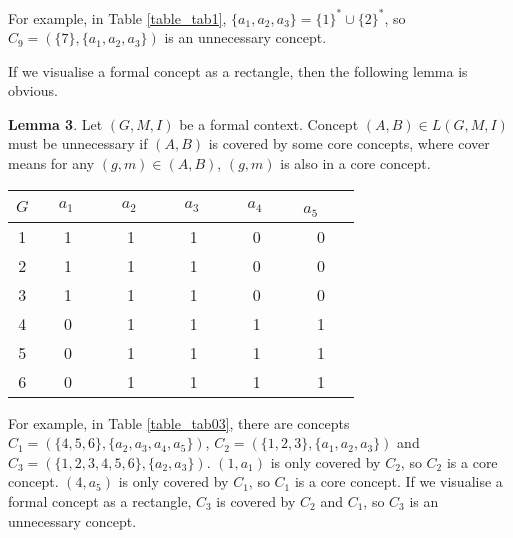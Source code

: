 \documentclass[11pt]{article}
\numberwithin{equation}{subsection}
\begin{document}
For example, in Table \ref{table_tab1}, $\{a_1, a_2, a_3\}=\{1\}^* \cup \{2\}^*$, so $C_9=(\{7\},\{a_1, a_2, a_3\}) $ is an  unnecessary concept.

If we visualise a formal concept as a rectangle, then the following lemma is obvious.

\textbf{ Lemma 3}. Let $(G, M, I)$ be a formal context.  Concept $(A,B)\in L(G, M, I)$ must be unnecessary if $(A,B)$ is covered by some core concepts, where cover means for any $(g,m)\in (A,B)$, $(g,m)$ is also in a core concept.





 \begin{table*}[ht]
            \begin{center}
                \begin{normalsize}
                    \caption{Formal context $(G, M, I_3)$}
                    \label{table_tab03}
                    \begin{tabular}
                        {|c|c c  c  c  c|}
                        \hline
                        $G$     & $\ \ \ \ a_1\ \ \ \ \ $       &  $\ \ \ \ a_2\ \ \ \ \ $  &  $\ \ \ \ a_3\ \ \ \ \ $  & $\ \ \ \ a_4\ \ \ \ \ $  &  $\ \ a_5$\ \ \  \\
                       \hline
 1 & 1   & 1  &  1  & 0 &  0  \\

 2 & 1  &  1  & 1 &  0  &  0   \\

 3 & 1   & 1 &  1  &  0  &  0   \\

4 & 0 &  1  & 1  & 1   &   1  \\

5 & 0 &  1  &  1  &  1 &   1  \\

6 & 0 &  1  &  1  &  1 &   1  \\

\hline
                    \end{tabular}
                \end{normalsize}
            \end{center}
        \end{table*}





For example, in Table \ref{table_tab03},   there are concepts $C_1=(\{4,5,6\},\{ a_2, a_3, a_4, a_5\}) $, $C_2=(\{1,2,3\},\{a_1, a_2, a_3\}) $ and $C_3=(\{1,2,3,4,5,6\},\{ a_2, a_3\}) $.  $(1, a_1)$ is only covered by  $C_2$, so $C_2$ is a core   concept.  $(4, a_5)$ is only covered by  $C_1$, so $C_1$ is a core   concept. If we visualise a formal concept as a rectangle,   $C_3$ is covered by  $C_2$ and  $C_1$, so   $C_3$ is an unnecessary concept.
\end{document}
